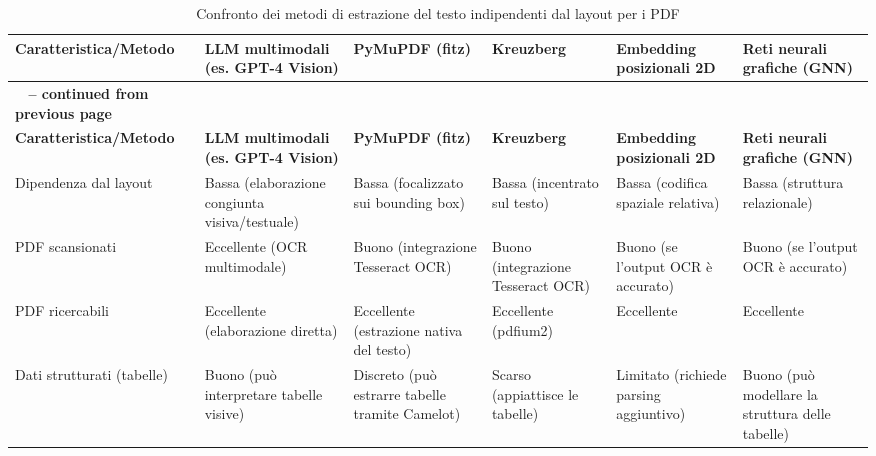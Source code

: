 \documentclass[a4paper, 11pt]{article}
\begin{document}
\begin{longtable}{>{\raggedright\arraybackslash}p{2.5cm} >{\raggedright\arraybackslash}p{2.2cm} >{\raggedright\arraybackslash}p{2.2cm} >{\raggedright\arraybackslash}p{2.2cm} >{\raggedright\arraybackslash}p{2.2cm} >{\raggedright\arraybackslash}p{2.2cm}}
\caption{Confronto dei metodi di estrazione del testo indipendenti dal layout per i PDF}\\
\toprule
\textbf{Caratteristica/Metodo} & \textbf{LLM multimodali (es. GPT-4 Vision)} & \textbf{PyMuPDF (fitz)} & \textbf{Kreuzberg} & \textbf{Embedding posizionali 2D} & \textbf{Reti neurali grafiche (GNN)} \\
\midrule
\endfirsthead
\multicolumn{6}{c}%
{{\bfseries \tablename\ \thetable{} -- continued from previous page}} \\
\toprule
\textbf{Caratteristica/Metodo} & \textbf{LLM multimodali (es. GPT-4 Vision)} & \textbf{PyMuPDF (fitz)} & \textbf{Kreuzberg} & \textbf{Embedding posizionali 2D} & \textbf{Reti neurali grafiche (GNN)} \\
\midrule
\endhead
\bottomrule
\endfoot
Dipendenza dal layout & Bassa (elaborazione congiunta visiva/testuale) \cite{problem_solved_layout_extraction} & Bassa (focalizzato sui bounding box) \cite{analytics_vidhya_pdf_extraction} & Bassa (incentrato sul testo) \cite{medium_kreuzberg} & Bassa (codifica spaziale relativa) \cite{docpolarbert} & Bassa (struttura relazionale) \cite{gnn_benchmarking} \\
\addlinespace
PDF scansionati & Eccellente (OCR multimodale) \cite{problem_solved_layout_extraction} & Buono (integrazione Tesseract OCR) \cite{analytics_vidhya_pdf_extraction} & Buono (integrazione Tesseract OCR) \cite{medium_kreuzberg} & Buono (se l'output OCR è accurato) & Buono (se l'output OCR è accurato) \\
\addlinespace
PDF ricercabili & Eccellente (elaborazione diretta) \cite{problem_solved_layout_extraction} & Eccellente (estrazione nativa del testo) \cite{analytics_vidhya_pdf_extraction} & Eccellente (pdfium2) \cite{medium_kreuzberg} & Eccellente & Eccellente \\
\addlinespace
Dati strutturati (tabelle) & Buono (può interpretare tabelle visive) \cite{problem_solved_layout_extraction} & Discreto (può estrarre tabelle tramite Camelot) \cite{analytics_vidhya_pdf_extraction} & Scarso (appiattisce le tabelle) \cite{medium_kreuzberg} & Limitato (richiede parsing aggiuntivo) & Buono (può modellare la struttura delle tabelle) \cite{survey_deep_learning_ocr} \\

\end{longtable}
\end{document}
